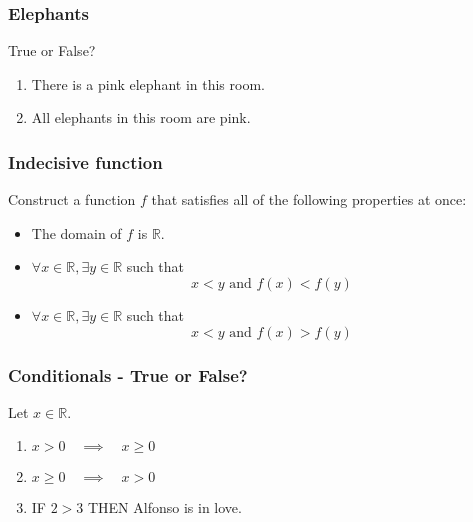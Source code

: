 \documentclass[14pt]{beamer}
\begin{document}

	\begin{frame}
		\frametitle{Elephants}

		True or False?

		\begin{enumerate}
			\item There is a pink elephant in this room.

			\item All elephants in this room are pink.
		\end{enumerate}
	\end{frame}

	\begin{frame}
		\frametitle{Indecisive function}

		Construct a function $f$ that satisfies all of the following properties at
		once:
		\begin{itemize}
			\item The domain of $f$ is $\mathbb{R}$.

			\item $\displaystyle \forall x \in \mathbb{R}, \exists y \in \mathbb{R}$ such
				that
				\[
					x<y \text{ and }f(x) < f(y)
				\]

			\item $\displaystyle \forall x \in \mathbb{R}, \exists y \in \mathbb{R}$ such
				that
				\[
					x<y \text{ and }f(x) > f(y)
				\]
		\end{itemize}
	\end{frame}

	\begin{frame}
		\frametitle{ Conditionals - True or False?}

		Let $\displaystyle x \in \mathbb{R}$.

		\begin{enumerate}
			\item $\displaystyle x > 0 \quad \implies \quad x \geq 0$

			\item $\displaystyle x \geq 0 \quad \implies \quad x > 0$

				\vfill

			\item IF $\displaystyle 2 > 3$ THEN Alfonso is in love.
		\end{enumerate}

		\vfill
	\end{frame}
\end{document}
